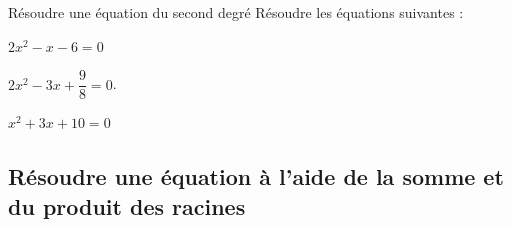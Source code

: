         
    \begin{bmethodet}{Résoudre une équation du second degré}
         Résoudre les équations suivantes : 
        \begin{enumMet}
            \item $2x^2-x-6=0$
            \item $2x^2-3x+\dfrac{9}{8}=0$.
            \item $x^2+3x+10=0$
        \end{enumMet}
    \end{bmethodet}
    
\subsection{Résoudre une équation à l'aide de la somme et du produit des racines}
    
